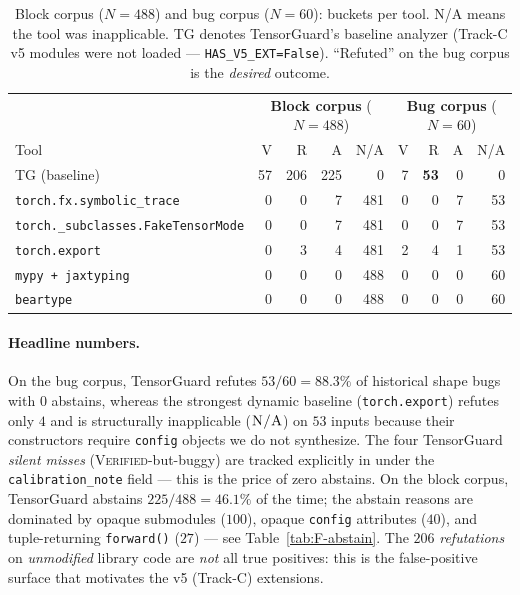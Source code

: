 \begin{table}[t]
\centering
\caption{Block corpus ($N=488$) and bug corpus ($N=60$):
buckets per tool.  N/A means the tool was inapplicable.
\textsc{TG} denotes TensorGuard's baseline analyzer (Track-C v5
modules were not loaded — \texttt{HAS\_V5\_EXT=False}).
``Refuted'' on the bug corpus is the \emph{desired} outcome.}
\label{tab:F-headline}
\small
\begin{tabular}{l rrrr | rrrr}
\toprule
& \multicolumn{4}{c|}{\textbf{Block corpus} ($N{=}488$)}
& \multicolumn{4}{c}{\textbf{Bug corpus} ($N{=}60$)} \\
Tool & V & R & A & N/A & V & R & A & N/A \\
\midrule
\textsc{TG} (baseline)               &  57 & 206 & 225 & 0  & 7 & \textbf{53} & 0 & 0 \\
\texttt{torch.fx.symbolic\_trace}    &   0 &   0 &   7 & 481 & 0 & 0 & 7 & 53 \\
\texttt{torch.\_subclasses.FakeTensorMode} & 0 & 0 &   7 & 481 & 0 & 0 & 7 & 53 \\
\texttt{torch.export}                &   0 &   3 &   4 & 481 & 2 & 4 & 1 & 53 \\
\texttt{mypy + jaxtyping}            &   0 &   0 &   0 & 488 & 0 & 0 & 0 & 60 \\
\texttt{beartype}                    &   0 &   0 &   0 & 488 & 0 & 0 & 0 & 60 \\
\bottomrule
\end{tabular}
\end{table}

\paragraph{Headline numbers.}
On the bug corpus, TensorGuard refutes $53/60 = 88.3\%$ of historical
shape bugs with $0$ abstains, whereas the strongest dynamic baseline
(\texttt{torch.export}) refutes only $4$ and is structurally inapplicable
($\textsc{N/A}$) on $53$ inputs because their constructors require
\texttt{config} objects we do not synthesize.  The four TensorGuard
\emph{silent misses} (\textsc{Verified}-but-buggy) are tracked
explicitly in 
under the \texttt{calibration\_note} field — this is the price of zero
abstains.  On the block corpus, TensorGuard abstains $225/488 = 46.1\%$
of the time; the abstain reasons are dominated by opaque submodules
($100$), opaque \texttt{config} attributes ($40$), and tuple-returning
\texttt{forward()} ($27$) — see Table~\ref{tab:F-abstain}.  The
$206$ \emph{refutations} on \emph{unmodified} library code are
\emph{not} all true positives: this is the false-positive surface that
motivates the v5 (Track-C) extensions.

